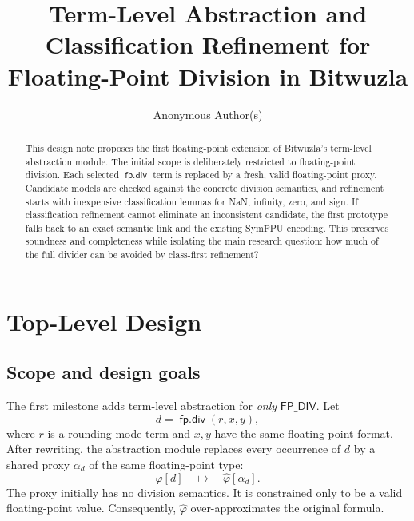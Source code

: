 \documentclass[runningheads]{llncs}
\title{Term-Level Abstraction and Classification Refinement for
Floating-Point Division in Bitwuzla}
\author{Anonymous Author(s)}
\institute{Anonymous Institution\\
\email{anonymous@example.org}}
\newcommand{\fpdiv}{\mathop{\mathsf{fp.div}}}
\newcommand{\proxy}{\alpha_d}
\begin{document}
\maketitle

\begin{abstract}
This design note proposes the first floating-point extension of Bitwuzla's
term-level abstraction module.  The initial scope is deliberately restricted
to floating-point division.  Each selected \(\fpdiv\) term is replaced by a
fresh, valid floating-point proxy.  Candidate models are checked against the
concrete division semantics, and refinement starts with inexpensive
classification lemmas for NaN, infinity, zero, and sign.  If classification
refinement cannot eliminate an inconsistent candidate, the first prototype
falls back to an exact semantic link and the existing SymFPU encoding.  This
preserves soundness and completeness while isolating the main research
question: how much of the full divider can be avoided by class-first
refinement?

\end{abstract}


\section{Top-Level Design}
\label{sec:top-level}

\subsection{Scope and design goals}

The first milestone adds term-level abstraction for \emph{only}
\(\mathsf{FP\_DIV}\).  Let
\[
  d = \fpdiv(r,x,y),
\]
where \(r\) is a rounding-mode term and \(x,y\) have the same floating-point
format.  After rewriting, the abstraction module replaces every occurrence of
\(d\) by a shared proxy \(\proxy\) of the same floating-point type:
\[
  \varphi[d] \quad\longmapsto\quad \widehat{\varphi}[\proxy].
\]
The proxy initially has no division semantics.  It is constrained only to be
a valid floating-point value.  Consequently,
\(\widehat{\varphi}\) over-approximates the original formula.
\end{document}

